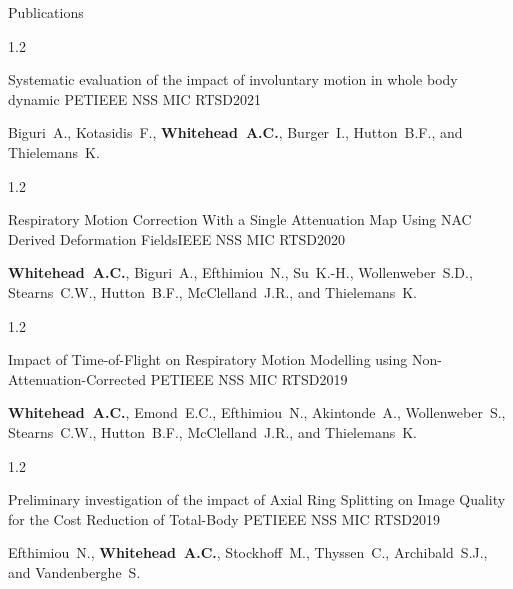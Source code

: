 \documentclass{cv}
\begin{document}
\begin{rSection}{Publications}
        \vspace{-0.5cm}
        \begin{spacing}{1.2}
            \item \begin{rSubsection}{Systematic evaluation of the impact of involuntary motion in whole body dynamic PET}{}{IEEE NSS MIC RTSD}{2021}
                \vspace{-0.25cm}
                \item Biguri~A., Kotasidis~F., \textbf{Whitehead~A.C.}, Burger~I., Hutton~B.F., and Thielemans~K.
            \end{rSubsection}
        \end{spacing}

        \vspace{-0.5cm}
        \begin{spacing}{1.2}
            \item \begin{rSubsection}{Respiratory Motion Correction With a Single Attenuation Map Using NAC Derived Deformation Fields}{}{IEEE NSS MIC RTSD}{2020}
                \vspace{-0.25cm}
                \item \textbf{Whitehead~A.C.}, Biguri~A., Efthimiou~N., Su~K.-H., Wollenweber~S.D., Stearns~C.W., Hutton~B.F., McClelland~J.R., and Thielemans~K.
            \end{rSubsection}
        \end{spacing}

        \vspace{-0.5cm}
        \begin{spacing}{1.2}
            \item \begin{rSubsection}{Impact of Time-of-Flight on Respiratory Motion Modelling using Non-Attenuation-Corrected \newline PET}{}{IEEE NSS MIC RTSD}{2019}
                \vspace{-0.25cm}
                \item \textbf{Whitehead~A.C.}, Emond~E.C., Efthimiou~N., Akintonde~A., Wollenweber~S., Stearns~C.W., Hutton~B.F., McClelland~J.R., and Thielemans~K.
            \end{rSubsection}
        \end{spacing}

        \vspace{-0.5cm}
        \begin{spacing}{1.2}
            \item \begin{rSubsection}{Preliminary investigation of the impact of Axial Ring Splitting on Image Quality for the Cost Reduction of Total-Body PET}{}{IEEE NSS MIC RTSD}{2019}
                \vspace{-0.25cm}
                \item Efthimiou~N., \textbf{Whitehead~A.C.}, Stockhoff~M., Thyssen~C., Archibald~S.J., and Vandenberghe~S.
            \end{rSubsection}
        \end{spacing}
    \end{rSection}
\end{document}
